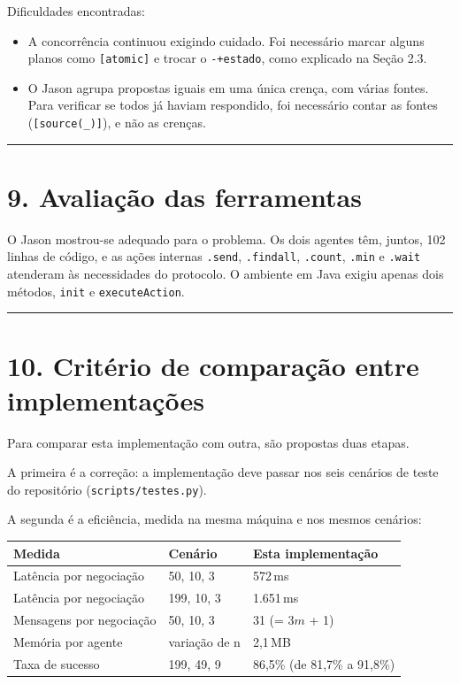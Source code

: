 \documentclass[11pt,a4paper]{article}
\newcommand{\cod}[1]{\texttt{#1}}
\newcommand{\separador}{\begin{center}\rule{0.45\linewidth}{0.4pt}\end{center}}
\begin{document}
Dificuldades encontradas:

\begin{itemize}
  \item A concorrência continuou exigindo cuidado. Foi necessário marcar alguns planos como \cod{[atomic]} e trocar o \cod{-+estado}, como explicado na Seção 2.3.
  \item O Jason agrupa propostas iguais em uma única crença, com várias fontes. Para verificar se todos já haviam respondido, foi necessário contar as fontes (\cod{[source(\_)]}), e não as crenças.
\end{itemize}

\separador

\section*{9. Avaliação das ferramentas}

O Jason mostrou-se adequado para o problema. Os dois agentes têm, juntos, 102 linhas de código, e as ações internas \cod{.send}, \cod{.findall}, \cod{.count}, \cod{.min} e \cod{.wait} atenderam às necessidades do protocolo. O ambiente em Java exigiu apenas dois métodos, \cod{init} e \cod{executeAction}.

\separador

\section*{10. Critério de comparação entre implementações}

Para comparar esta implementação com outra, são propostas duas etapas.

A primeira é a correção: a implementação deve passar nos seis cenários de teste do repositório (\cod{scripts/testes.py}).

A segunda é a eficiência, medida na mesma máquina e nos mesmos cenários:

\begin{center}
\begin{tabular}{lll}
\toprule
Medida & Cenário & Esta implementação \\
\midrule
Latência por negociação & 50, 10, 3 & 572\,ms \\
Latência por negociação & 199, 10, 3 & 1.651\,ms \\
Mensagens por negociação & 50, 10, 3 & 31 (= 3$m$ + 1) \\
Memória por agente & variação de n & 2,1\,MB \\
Taxa de sucesso & 199, 49, 9 & 86,5\% (de 81,7\% a 91,8\%) \\
\bottomrule
\end{tabular}
\end{center}
\end{document}
